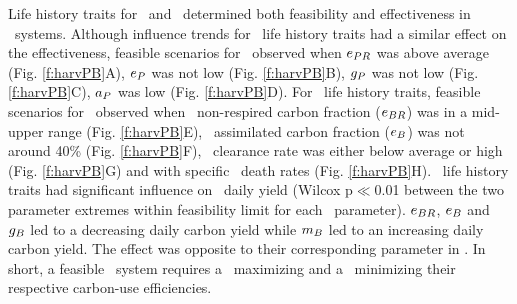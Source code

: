 \documentclass[env.tex]{subfiles}
\begin{document}
Life history traits for \phy\ and \bac\ determined both feasibility and effectiveness in \PBH\ systems.  Although influence trends for \phy\ life history traits had a similar effect on the effectiveness, feasible scenarios for \PBH\ observed when $e_{PR}$ was above average (Fig. \ref{f:harvPB}A), $e_P$ was not low (Fig. \ref{f:harvPB}B), $g_P$ was not low (Fig. \ref{f:harvPB}C), $a_P$ was low (Fig. \ref{f:harvPB}D).  For \bac\ life history traits, feasible scenarios for \PBH\ observed when \bac\ non-respired carbon fraction ($e_{BR}$) was in a mid-upper range (Fig. \ref{f:harvPB}E), \bac\ assimilated carbon fraction ($e_B$) was not around 40\% (Fig. \ref{f:harvPB}F), \bac\ clearance rate was either below average or high (Fig. \ref{f:harvPB}G) and with specific \bac\ death rates (Fig. \ref{f:harvPB}H).  \Bac\ life history traits had significant influence on \PBH\ daily yield (Wilcox p$\ll$0.01 between the two parameter extremes within feasibility limit for each \bac\ parameter).  $e_{BR}$, $e_B$ and $g_B$ led to a decreasing daily carbon yield while $m_B$ led to an increasing daily carbon yield.  The effect was opposite to their corresponding parameter in \phy.  In short, a feasible \PBH\ system requires a \phy\ maximizing and a \bac\ minimizing their respective carbon-use efficiencies.
\end{document}
